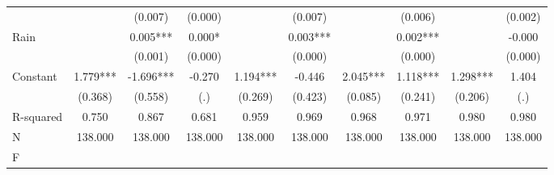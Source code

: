 {\begin{tabular}{l*{9}{c}}
                    &               &     (0.007)   &     (0.000)   &               &     (0.007)   &               &     (0.006)   &               &     (0.002)   \\
Rain                &               &       0.005***&       0.000*  &               &       0.003***&               &       0.002***&               &      -0.000   \\
                    &               &     (0.001)   &     (0.000)   &               &     (0.000)   &               &     (0.000)   &               &     (0.000)   \\
Constant            &       1.779***&      -1.696***&      -0.270   &       1.194***&      -0.446   &       2.045***&       1.118***&       1.298***&       1.404   \\
                    &     (0.368)   &     (0.558)   &         (.)   &     (0.269)   &     (0.423)   &     (0.085)   &     (0.241)   &     (0.206)   &         (.)   \\
\hline
R-squared           &       0.750   &       0.867   &       0.681   &       0.959   &       0.969   &       0.968   &       0.971   &       0.980   &       0.980   \\
N                   &     138.000   &     138.000   &     138.000   &     138.000   &     138.000   &     138.000   &     138.000   &     138.000   &     138.000   \\
F                   &               &               &               &               &               &               &               &               &               \\
\hline\hline
\end{tabular}
}
